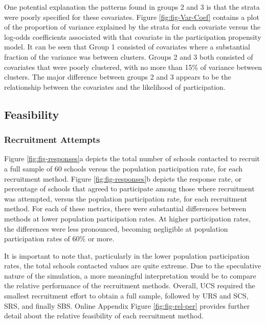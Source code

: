 \documentclass[
  english,
  man,floatsintext]{apa6}
\begin{document}
One potential explanation the patterns found in groups 2 and 3 is that the strata were poorly specified for these covariates. Figure \ref{fig:fig-Var-Coef} contains a plot of the proportion of variance explained by the strata for each covariate versus the log-odds coefficients associated with that covariate in the participation propensity model.
It can be seen that Group 1 consisted of covariates where a substantial fraction of the variance was between clusters. Groups 2 and 3 both consisted of covariates that were poorly clustered, with no more than 15\% of variance between clusters. The major difference between groups 2 and 3 appears to be the relationship between the covariates and the likelihood of participation.



\hypertarget{feasibility-1}{%
\subsection{Feasibility}\label{feasibility-1}}

\hypertarget{recruitment-attempts}{%
\subsubsection{Recruitment Attempts}\label{recruitment-attempts}}

Figure \ref{fig:fig-responses}a depicts the total number of schools contacted to recruit a full sample of 60 schools versus the population participation rate, for each recruitment method. Figure \ref{fig:fig-responses}b depicts the response rate, or percentage of schools that agreed to participate among those where recruitment was attempted, versus the population participation rate, for each recruitment method. For each of these metrics, there were substantial differences between methods at lower population participation rates. At higher participation rates, the differences were less pronounced, becoming negligible at population participation rates of 60\% or more.

It is important to note that, particularly in the lower population participation rates, the total schools contacted values are quite extreme. Due to the speculative nature of the simulation, a more meaningful interpretation would be to compare the relative performance of the recruitment methods. Overall, UCS required the smallest recruitment effort to obtain a full sample, followed by URS and SCS, SRS, and finally SBS. Online Appendix Figure \ref{fig:fig-rel-per} provides further detail about the relative feasibility of each recruitment method.
\end{document}
